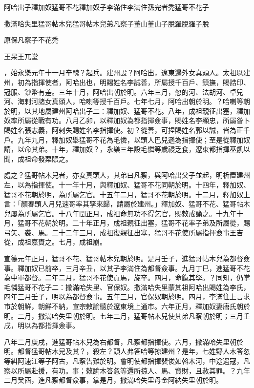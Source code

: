
\begin{pinyinscope}
阿哈出子釋加奴猛哥不花釋加奴子李滿住李滿住孫完者禿猛哥不花子

撒滿哈失里猛哥帖木兒猛哥帖木兒弟凡察子董山董山子脫羅脫羅子脫

原保凡察子不花禿

王杲王兀堂

，始永樂元年十一月辛醜？起兵。建州設？阿哈出，遼東邊外女真頭人。太祖以建州，初為指揮使者，阿哈出也，明賜姓名李誠善，所屬授千百戶、鎮撫，賜誥印、冠服、鈔幣有差。三年十月，阿哈出朝於明。六年三月，忽的河、法胡河、卓兒河、海剌河諸女真頭人，哈喇等授千百戶。七年七月，阿哈出朝於明。？哈喇等朝於明，以其地屬建州阿哈出子二：釋加奴、猛哥不花。八年，成祖親征出塞，釋加奴率所屬從戰有功。八月乙卯，以釋加奴為都指揮僉事，賜姓名李顯忠，所屬昝卜賜姓名張志義，阿剌失賜姓名李指揮使。初？從善，可捏賜姓名郭以誠，皆為正千戶。九年九月，釋加奴舉猛哥不花為毛憐，以頭人巴兒遜為指揮使；至是從釋加奴請，以命其弟。十年，釋加奴？，永樂三年設毛憐等歲祲乏食，遼東都指揮巫凱以聞，成祖命發粟賑之。

處之？猛哥帖木兒者，亦女真頭人，其弟曰凡察，與阿哈出父子並起，明析置建州左，以為指揮使。十一年十月，與釋加奴、猛哥不花同朝於明。十四年，釋加奴、猛哥不花朝於明，為所屬乞官。十五年二月，猛哥不花朝於明。十二月，釋加奴上言：「顏春頭人月兒速哥率其孥來歸，請屬於建州。」釋加奴、猛哥不花、猛哥帖木兒屢為所屬乞官。十八年閏正月，成祖命無功不得乞官，賜敕戒諭之。十九年十月，猛哥不花朝於明。二十年正月，成祖親征出塞，猛哥不花率子弟及所屬從，賜弓矢、裘、馬。二十二年三月，成祖復親征出塞，猛哥不花使所屬指揮僉事王吉從，成祖嘉賚之。七月，成祖崩。

宣德元年正月，猛哥不花、猛哥帖木兒朝於明。是月壬子，進猛哥帖木兒為都督僉事。釋加奴已前卒，三月辛丑，以其子李滿住為都督僉事。九月丁巳，進猛哥不花為中軍都督。二年二月，猛哥不花使貢馬，旋卒。四月，命餼其孥。？同知，仍掌毛憐猛哥不花子二：撒滿哈失里、官保奴。撒滿哈失里蒙其祖阿哈出賜姓為李氏，四年三月壬子，明以為都督僉事。五年三月，官保奴朝於明。四月，李滿住上言求市於朝鮮，朝鮮不納，宣宗敕諭聽於遼東境上通市。六年正月，釋加奴妻唐氏朝於明。二月，撒滿哈失里朝於明。七年二月，猛哥帖木兒使其弟凡察朝於明；三月壬戌，明以為都指揮僉事。

八年二月庚戌，進猛哥帖木兒為右都督，凡察都指揮使。六月，撒滿哈失里朝於明。都督猛哥帖木兒及其？，殺左？頭人弗答哈等掠建州？是年，七姓野人木答忽等糾阿速江等子阿古，凡察告難於明。會明使都指揮裴俊如斡木河，中途遇寇，凡察以所屬赴援，有功。事；敕諭木答忽等還所掠人、馬、貲財，且赦其罪。？九年二月癸酉，進凡察都督僉事，掌是月，撒滿哈失里母金阿納失里朝於明。


\end{pinyinscope}
